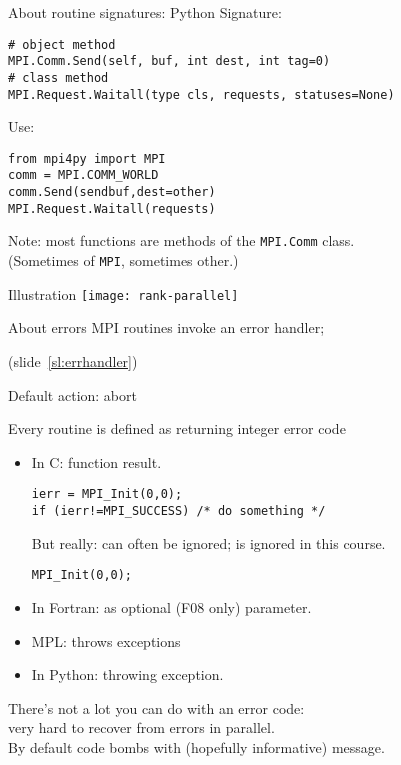 \begin{python}
  \addtocounter{slidecount}{-1}
\begin{numberedframe}{About routine signatures: Python}
Signature:
\lstset{language=Python}
\begin{lstlisting}
# object method
MPI.Comm.Send(self, buf, int dest, int tag=0)
# class method
MPI.Request.Waitall(type cls, requests, statuses=None)
\end{lstlisting}
Use:
\begin{lstlisting}
from mpi4py import MPI
comm = MPI.COMM_WORLD
comm.Send(sendbuf,dest=other)
MPI.Request.Waitall(requests)
\end{lstlisting}
Note: most functions are methods of the \lstinline{MPI.Comm} class.\\
(Sometimes of \lstinline{MPI}, sometimes other.)
\end{numberedframe}
\end{python}

\begin{exerciseframe}[commrank]
  
\end{exerciseframe}

\begin{exerciseframe}[commrank]
  
\end{exerciseframe}

\begin{numberedframe}{Illustration}
  \texttt{[image: rank-parallel]}
\end{numberedframe}

\begin{numberedframe}{About errors}
  MPI routines invoke an error handler;
\begin{full}
    (slide~\ref{sl:errhandler})
\end{full}
  Default action: abort
  
  Every routine is defined as returning integer error code
  \begin{itemize}
  \item In C: function result. 
\lstset{language=C++}
\begin{lstlisting}
ierr = MPI_Init(0,0);
if (ierr!=MPI_SUCCESS) /* do something */
\end{lstlisting}
  But really: can often be ignored; is ignored in this course.
\begin{lstlisting}
MPI_Init(0,0);
\end{lstlisting}
  \item In Fortran: as optional (F08 only) parameter.
  \item MPL: throws exceptions
  \item In Python: throwing exception.
  \end{itemize}
  There's not a lot you can do with an error code:\\
  very hard to recover from errors in parallel.\\
  By default code bombs with (hopefully informative) message.
\end{numberedframe}

